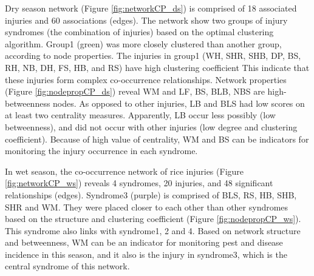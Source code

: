 Dry season network (Figure \ref{fig:networkCP_ds}) is comprised of 18 associated injuries and  60 associations (edges). The network show two groups of injury syndromes (the combination of injuries) based on the optimal clustering algorithm. Group1 (green) was more closely clustered than another group, according to node properties. The injuries in group1 (WH, SHR, SHB, DP, BS, RH, NB, DH, FS, HB, and RS) have high clustering coefficient This indicate that these injuries form complex co-occurrence relationships. Network properties (Figure \ref{fig:nodepropCP_ds}) reveal WM and LF, BS, BLB, NBS are high-betweenness nodes. As opposed to other injuries, LB and BLS had low scores on at least two centrality measures. Apparently, LB occur less possibly (low betweenness), and did not occur with other injuries (low degree and clustering coefficient). Because of high value of centrality, WM and BS can be indicators for monitoring the injury occurrence in each syndrome.

In wet season, the co-occurrence network of rice injuries (Figure \ref{fig:networkCP_ws}) reveals 4 syndromes, 20 injuries, and 48 significant relationships (edges). Syndrome3 (purple) is comprised of BLS, RS, HB, SHB, SHR and WM. They were placed closer to each other than other syndromes based on the structure and clustering coefficient (Figure \ref{fig:nodepropCP_ws}). This syndrome also links with syndrome1, 2 and 4. Based on network structure and betweenness, WM can be an indicator for monitoring pest and disease incidence in this season, and it also is the injury in syndrome3, which is the central syndrome of this network. 

